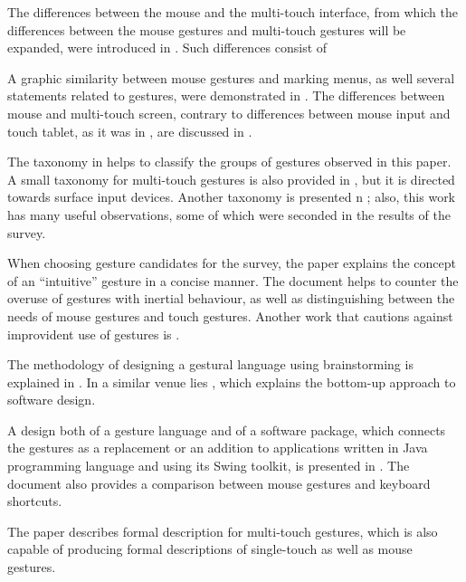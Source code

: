 \documentclass{aes130}
\begin{document}
The differences between the mouse and the multi-touch interface, from which the differences between
the mouse gestures and multi-touch gestures will be expanded, were introduced in \cite{Buxton:1985:ITT:325334.325239}.
Such differences consist of 

A graphic similarity between mouse gestures and marking menus, as well several statements related
to gestures, were demonstrated in \cite{Kurtenbach:1993:LEP:164632.164977}.
The differences between mouse and multi-touch screen, contrary to differences between mouse input
and touch tablet, as it was in \cite{Kurtenbach:1993:LEP:164632.164977}, are discussed in
\cite{Forlines:2007:DVM:1240624.1240726}.

The taxonomy in \cite{ecs11149} helps to classify the groups of gestures observed in this paper.
A small taxonomy for multi-touch gestures is also provided in \cite{Wigdor:2010:ANU:1842993.1842997},
but it is directed towards surface input devices. Another taxonomy is presented 
n \cite{Wobbrock:2009:UGS:1518701.1518866}; also, this work has many useful observations,
some of which were seconded in the results of the survey.

When choosing gesture candidates for the survey, the paper \cite{Naumann:2007:IUU:1784197.1784212}
explains the concept of an ``intuitive'' gesture in a concise manner. The document \cite{Lee:2009:EEP:1520340.1520667}
helps to counter the overuse of gestures with inertial behaviour, as well as distinguishing between
the needs of mouse gestures and touch gestures. Another work that cautions against improvident use
of gestures is \cite{Norman:2010:GIS:1836216.1836228}.

The methodology of designing a gestural language using brainstorming is explained in
\cite{Akers:2007:ODM:1240866.1240868}. In a similar venue lies \cite{SalatBottomUpApproach}, which explains
the bottom-up approach to software design.

A design both of a gesture language and of a software package, which connects the gestures
as a replacement or an addition to applications written in Java programming language and using
its Swing toolkit, is presented in \cite{Appert:2009:USC:1518701.1519052}. The document also
provides a comparison between mouse gestures and keyboard shortcuts.

The paper \cite{Kammer:2010:TFM:1936652.1936662} describes formal description for multi-touch gestures,
which is also capable of producing formal descriptions of single-touch as well as mouse gestures.
\end{document}
